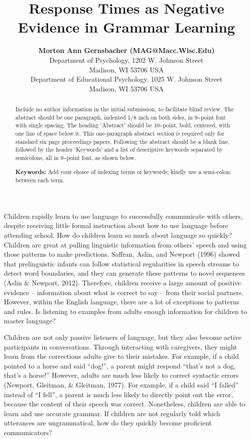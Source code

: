 \documentclass[10pt, letterpaper]{article}
\title{Response Times as Negative Evidence in Grammar Learning}
\author{{\large \bf Morton Ann Gernsbacher (MAG@Macc.Wisc.Edu)} \\ Department of Psychology, 1202 W. Johnson Street \\ Madison, WI 53706 USA \AND {\large \bf Sharon J.~Derry (SDJ@Macc.Wisc.Edu)} \\ Department of Educational Psychology, 1025 W. Johnson Street \\ Madison, WI 53706 USA}
\begin{document}
\maketitle

\begin{abstract}
Include no author information in the initial submission, to facilitate
blind review. The abstract should be one paragraph, indented 1/8 inch on
both sides, in 9\textasciitilde point font with single spacing. The
heading `Abstract' should be 10\textasciitilde point, bold, centered,
with one line of space below it. This one-paragraph abstract section is
required only for standard six page proceedings papers. Following the
abstract should be a blank line, followed by the header `Keywords' and a
list of descriptive keywords separated by semicolons, all in
9\textasciitilde point font, as shown below.

\textbf{Keywords:}
Add your choice of indexing terms or keywords; kindly use a semi-colon;
between each term.
\end{abstract}

Children rapidly learn to use language to successfully communicate with
others, despite receiving little formal instruction about how to use
language before attending school. How do children learn so much about
language so quickly? Children are great at pulling linguistic
information from others' speech and using those patterns to make
predictions. Saffran, Aslin, and Newport (1996) showed that
prelinguistic infants can follow statistical regularities in speech
streams to detect word boundaries, and they can generate these patterns
to novel sequences (Aslin \& Newport, 2012). Therefore, children receive
a large amount of positive evidence -- information about what is correct
to say -- from their social partners. However, within the English
language, there are a lot of exceptions to patterns and rules. Is
listening to examples from adults enough information for children to
master language?

Children are not only passive listeners of language, but they also
become active participants in conversations. Through interacting with
caregivers, they might learn from the corrections adults give to their
mistakes. For example, if a child pointed to a horse and said ``dog!'',
a parent might respond ``that's not a dog, that's a horse!'' However,
adults are much less likely to correct syntactic errors (Newport,
Gleitman, \& Gleitman, 1977). For example, if a child said ``I falled''
instead of ``I fell'', a parent is much less likely to directly point
out the error, because the content of their speech was correct.
Nonetheless, children are able to learn and use accurate grammar. If
children are not regularly told which utterances are ungrammatical, how
do they quickly become proficient communicators?
\end{document}
